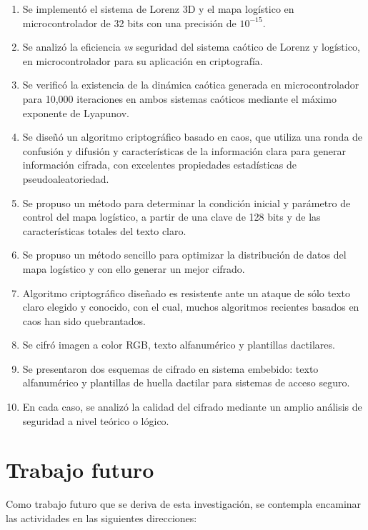 \begin{enumerate}
\item  Se implementó el sistema de Lorenz 3D y el mapa logístico en microcontrolador de 32 bits con una precisión de $10^{-15}$.

\item  Se analizó la eficiencia \textit{vs} seguridad del sistema caótico de Lorenz y logístico, en microcontrolador para su aplicación en criptografía.

\item Se verificó la existencia de la dinámica caótica generada en microcontrolador para 10,000 iteraciones en ambos sistemas caóticos mediante el máximo exponente de Lyapunov. 

\item Se diseñó un algoritmo criptográfico basado en caos, que utiliza una ronda de confusión y difusión y características de la información clara para generar información cifrada, con excelentes propiedades estadísticas de pseudoaleatoriedad.

\item Se propuso un método para determinar la condición inicial y parámetro de control del mapa logístico, a partir de una clave de 128 bits y de las características totales del texto claro. 

\item Se propuso un método sencillo para optimizar la distribución de datos del mapa logístico y con ello generar un mejor cifrado.

\item Algoritmo criptográfico diseñado es resistente ante un ataque de sólo texto claro elegido y conocido, con el cual, muchos algoritmos recientes basados en caos han sido quebrantados.

\item Se cifró imagen a color RGB, texto alfanumérico y plantillas dactilares. 

\item Se presentaron dos esquemas de cifrado en sistema embebido: texto alfanumérico y plantillas de huella dactilar para sistemas de acceso seguro.

\item En cada caso, se analizó la calidad del cifrado mediante un amplio análisis de seguridad a nivel teórico o lógico. 

\end{enumerate}

\section{Trabajo futuro}
Como trabajo futuro que se deriva de esta investigación, se contempla encaminar las actividades en las siguientes direcciones:

